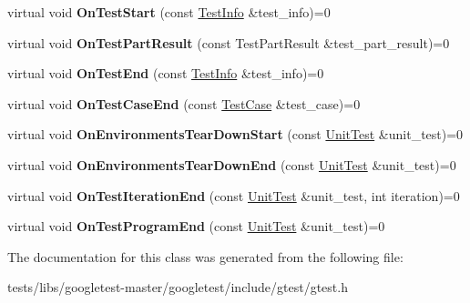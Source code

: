 \begin{DoxyCompactItemize}
virtual void {\bfseries On\+Test\+Start} (const \hyperlink{classtesting_1_1TestInfo}{Test\+Info} \&test\+\_\+info)=0
\item 
\mbox{\label{classtesting_1_1TestEventListener_a054f8705c883fa120b91473aff38f2ee}} 
virtual void {\bfseries On\+Test\+Part\+Result} (const Test\+Part\+Result \&test\+\_\+part\+\_\+result)=0
\item 
\mbox{\label{classtesting_1_1TestEventListener_abb1c44525ef038500608b5dc2f17099b}} 
virtual void {\bfseries On\+Test\+End} (const \hyperlink{classtesting_1_1TestInfo}{Test\+Info} \&test\+\_\+info)=0
\item 
\mbox{\label{classtesting_1_1TestEventListener_ae61985e2ef76ac78379b077be57a9c36}} 
virtual void {\bfseries On\+Test\+Case\+End} (const \hyperlink{classtesting_1_1TestCase}{Test\+Case} \&test\+\_\+case)=0
\item 
\mbox{\label{classtesting_1_1TestEventListener_a468b5e6701bcb86cb2c956caadbba5e4}} 
virtual void {\bfseries On\+Environments\+Tear\+Down\+Start} (const \hyperlink{classtesting_1_1UnitTest}{Unit\+Test} \&unit\+\_\+test)=0
\item 
\mbox{\label{classtesting_1_1TestEventListener_a9ea04fa7f447865ba76df35e12ba2092}} 
virtual void {\bfseries On\+Environments\+Tear\+Down\+End} (const \hyperlink{classtesting_1_1UnitTest}{Unit\+Test} \&unit\+\_\+test)=0
\item 
\mbox{\label{classtesting_1_1TestEventListener_a550fdb3e55726e4cefa09f5697941425}} 
virtual void {\bfseries On\+Test\+Iteration\+End} (const \hyperlink{classtesting_1_1UnitTest}{Unit\+Test} \&unit\+\_\+test, int iteration)=0
\item 
\mbox{\label{classtesting_1_1TestEventListener_ad15b6246d94c268e233487a86463ef3d}} 
virtual void {\bfseries On\+Test\+Program\+End} (const \hyperlink{classtesting_1_1UnitTest}{Unit\+Test} \&unit\+\_\+test)=0
\end{DoxyCompactItemize}


The documentation for this class was generated from the following file\+:\begin{DoxyCompactItemize}
\item 
tests/libs/googletest-\/master/googletest/include/gtest/gtest.\+h\end{DoxyCompactItemize}
